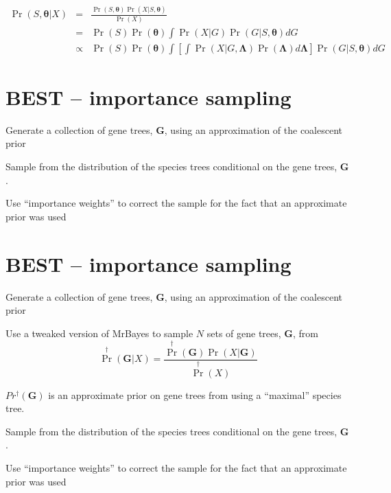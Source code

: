 \documentclass[landscape]{foils}
\begin{document}
\begin{eqnarray*}
	\Pr(S,\bm{\theta}|X) & =  & \frac{\Pr(S,\bm{\theta})\Pr(X|S,\bm{\theta})}{\Pr(X)} \\
				& =  & \Pr(S)\Pr(\bm{\theta})\int\Pr(X|G)\Pr(G|S,\bm{\theta})dG \\
				& \propto  & \Pr(S)\Pr(\bm{\theta})\int\left[\int \Pr(X|G, \bm{\Lambda}) \Pr(\bm{\Lambda}) d\bm{\Lambda}\right]\Pr(G|S,\bm{\theta})dG 
\end{eqnarray*}

\myNewSlide
\section*{BEST -- importance sampling}
\begin{compactenum}
	\item Generate a collection of gene trees, $\bm{G}$, using an approximation of the coalescent prior
	\item Sample from the distribution of the species trees conditional on the gene trees, $\bm{G}$.
	\item Use ``importance weights'' to correct the sample for the fact that an approximate prior was used
\end{compactenum}

\myNewSlide
\section*{BEST -- importance sampling}
\begin{compactenum}
	\item Generate a collection of gene trees, $\bm{G}$, using an approximation of the coalescent prior
		\begin{compactenum}
		\item Use a tweaked version of MrBayes to sample $N$ sets of gene trees, $\bm{G}$, from \[\Pr^{\dag}(\bm{G}|X) = \frac{\Pr^{\dag}(\bm{G})\Pr(X|\bm{G})}{\Pr^{\dag}(X)}\]
			\item $Pr^{\dag}(\bm{G})$ is an approximate prior on gene trees from using a ``maximal'' species tree.
		\end{compactenum}
	\item Sample from the distribution of the species trees conditional on the gene trees, $\bm{G}$.
	\item Use ``importance weights'' to correct the sample for the fact that an approximate prior was used
\end{compactenum}

\myNewSlide
\end{document}
